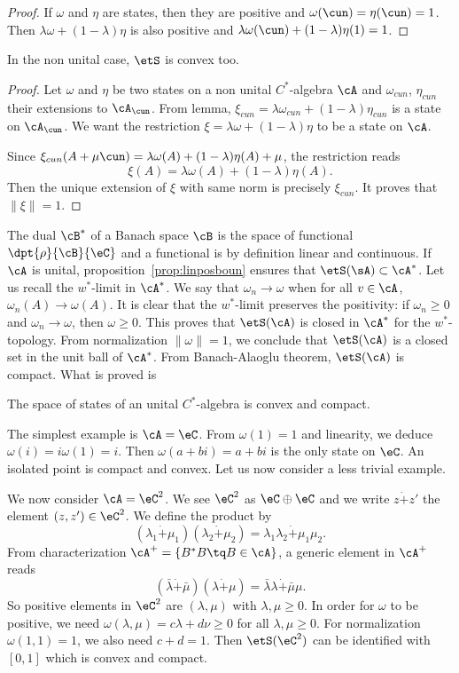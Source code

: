 \begin{proof}
	If $\omega$ and $\eta$ are states, then they are positive and $\omega(\cun)=\eta(\cun)=1$. Then $\lambda\omega+(1-\lambda)\eta$ is also positive and $\lambda\omega(\cun)+(1-\lambda)\eta(1)=1$.
\end{proof}

\begin{proposition}
	In the non unital case, $\etS$ is convex too.
\end{proposition}

\begin{proof}
	Let $\omega$ and $\eta$ be two states on a non unital $C^*$-algebra $\cA$ and $\omega_{cun}$, $\eta_{cun}$ their extensions to $\cA_{\cun}$. From lemma, $\xi_{cun}=\lambda\omega_{cun}+(1-\lambda)\eta_{cun}$ is a state on $\cA_{\cun}$. We want the restriction $\xi=\lambda\omega+(1-\lambda)\eta$ to be a state on $\cA$.

	Since $\xi_{cun}(A+\mu\cun)=\lambda\omega(A)+(1-\lambda)\eta(A)+\mu$, the restriction reads
	\[
		\xi(A)=\lambda\omega(A)+(1-\lambda)\eta(A).
	\]
	Then the unique extension of $\xi$ with same norm is precisely $\xi_{cun}$. It proves that $\| \xi \|=1$.
\end{proof}

The dual $\cB^*$ of a Banach space $\cB$ is the space of functional $\dpt{\rho}{\cB}{\eC}$ and a functional is by definition linear and continuous. If $\cA$ is unital, proposition~\ref{prop:linposboun} ensures that $\etS(\sA)\subset\cA^*$. Let us recall the $w^*$-limit in $\cA^*$. We say that $\omega_n\to \omega$ when for all $v\in\cA$, $\omega_n(A)\to \omega(A)$. It is clear that the $w^*$-limit preserves the positivity: if $\omega_n\geq0$ and $\omega_n\to \omega$, then $\omega\geq 0$. This proves that $\etS(\cA)$ is closed in $\cA^*$ for the $w^*$-topology. From normalization $\| \omega \|=1$, we conclude  that $\etS(\cA)$ is a closed set in the unit ball of $\cA^*$. From Banach-Alaoglu theorem, $\etS(\cA)$ is compact. What is proved is

\begin{proposition}
	The space of states of an unital $C^*$-algebra is convex and compact.
\end{proposition}

The simplest example is $\cA=\eC$. From $\omega(1)=1$ and linearity, we deduce $\omega(i)=i\omega(1)=i$. Then $\omega(a+bi)=a+bi$ is the only state on $\eC$. An isolated point is compact and convex. Let us now consider a less trivial example.

We now consider $\cA=\eC^2$. We see $\eC^2$ as $\eC\oplus\eC$ and we write $z\dot + z'$ the element $(z,z')\in\eC^2$. We define the product by
\[
	(\lambda_1\dot +\mu_1)(\lambda_2\dot +\mu_2)=\lambda_1\lambda_2\dot +\mu_1\mu_2.
\]
From characterization $\cA^+=\{ B^*B\tq B\in\cA \}$, a generic element in $\cA^+$ reads
\[
	(\bar\lambda\dot +\bar\mu)(\lambda\dot +\mu)=\bar\lambda\lambda\dot +\bar\mu\mu.
\]
So positive elements in $\eC^2$ are $(\lambda,\mu)$ with $\lambda,\mu\geq 0$. In order for $\omega$ to be positive, we need $\omega(\lambda,\mu)=c\lambda+d\nu\geq 0$ for all $\lambda,\mu\geq0$. For normalization $\omega(1,1)=1$, we also need $c+d=1$. Then $\etS(\eC^2)$ can be identified with $[0,1]$ which is convex and compact.
